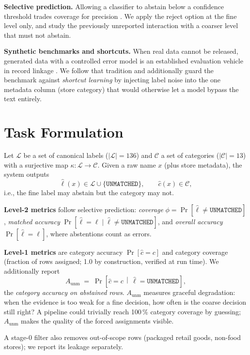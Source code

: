 \documentclass[10pt,twocolumn]{article}
\newcommand{\unmatched}{\texttt{UNMATCHED}}
\begin{document}
\textbf{Selective prediction.}
Allowing a classifier to abstain below a confidence threshold trades
coverage for precision \cite{chow1970,elyaniv2010}. We apply the reject
option at the fine level only, and study the previously unreported
interaction with a coarser level that must not abstain.

\textbf{Synthetic benchmarks and shortcuts.}
When real data cannot be released, generated data with a controlled error
model is an established evaluation vehicle in record linkage
\cite{christen2005}. We follow that tradition and additionally guard the
benchmark against \emph{shortcut learning} \cite{geirhos2020} by injecting
label noise into the one metadata column (store category) that would
otherwise let a model bypass the text entirely.

\section{Task Formulation}
\label{sec:task}

Let $\mathcal{L}$ be a set of canonical labels ($|\mathcal{L}|{=}136$) and
$\mathcal{C}$ a set of categories ($|\mathcal{C}|{=}13$) with a surjective
map $\kappa:\mathcal{L}\rightarrow\mathcal{C}$. Given a raw name $x$ (plus
store metadata), the system outputs
\[
\hat{\ell}(x)\in\mathcal{L}\cup\{\unmatched\},\qquad
\hat{c}(x)\in\mathcal{C},
\]
i.e., the fine label may abstain but the category may not.

\textbf{Level-2 metrics} follow selective prediction: \emph{coverage}
$\phi=\Pr[\hat{\ell}\neq\unmatched]$, \emph{matched accuracy}
$\Pr[\hat{\ell}=\ell \mid \hat{\ell}\neq\unmatched]$, and \emph{overall
accuracy} $\Pr[\hat{\ell}=\ell]$, where abstentions count as errors.

\textbf{Level-1 metrics} are category accuracy $\Pr[\hat{c}=c]$ and category
coverage (fraction of rows assigned; 1.0 by construction, verified at run
time). We additionally report
\[
A_{\text{unm}}
  \;=\;
  \Pr\!\left[\hat{c}=c \,\middle|\, \hat{\ell}=\unmatched\right],
\]
the \emph{category accuracy on abstained rows}. $A_{\text{unm}}$ measures
graceful degradation: when the evidence is too weak for a fine decision, how
often is the coarse decision still right? A pipeline could trivially reach
100\,\% category coverage by guessing; $A_{\text{unm}}$ makes the quality of
the forced assignments visible.

A stage-0 filter also removes out-of-scope rows (packaged retail goods,
non-food stores); we report its leakage separately.
\end{document}
